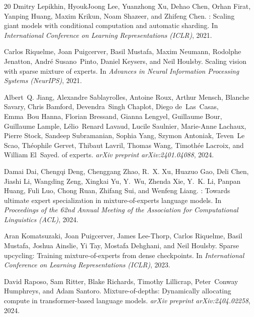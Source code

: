 \documentclass{article}
\begin{document}
\begin{thebibliography}{20}
Dmitry Lepikhin, HyoukJoong Lee, Yuanzhong Xu, Dehao Chen, Orhan Firat, Yanping Huang, Maxim Krikun, Noam Shazeer, and Zhifeng Chen.
: Scaling giant models with conditional computation and automatic sharding.
\newblock In \textit{International Conference on Learning Representations (ICLR)}, 2021.

Carlos Riquelme, Joan Puigcerver, Basil Mustafa, Maxim Neumann, Rodolphe Jenatton, Andr\'{e} Susano~Pinto, Daniel Keysers, and Neil Houlsby.
\newblock Scaling vision with sparse mixture of experts.
\newblock In \textit{Advances in Neural Information Processing Systems (NeurIPS)}, 2021.

Albert~Q. Jiang, Alexandre Sablayrolles, Antoine Roux, Arthur Mensch, Blanche Savary, Chris Bamford, Devendra~Singh Chaplot, Diego de~Las~Casas, Emma~Bou Hanna, Florian Bressand, Gianna Lengyel, Guillaume Bour, Guillaume Lample, L\'{e}lio~Renard Lavaud, Lucile Saulnier, Marie-Anne Lachaux, Pierre Stock, Sandeep Subramanian, Sophia Yang, Szymon Antoniak, Teven~Le Scao, Th\'{e}ophile Gervet, Thibaut Lavril, Thomas Wang, Timoth\'{e}e Lacroix, and William El~Sayed.
 of experts.
\newblock \textit{arXiv preprint arXiv:2401.04088}, 2024.

Damai Dai, Chengqi Deng, Chenggang Zhao, R.~X. Xu, Huazuo Gao, Deli Chen, Jiashi Li, Wangding Zeng, Xingkai Yu, Y.~Wu, Zhenda Xie, Y.~K. Li, Panpan Huang, Fuli Luo, Chong Ruan, Zhifang Sui, and Wenfeng Liang.
: Towards ultimate expert specialization in mixture-of-experts language models.
\newblock In \textit{Proceedings of the 62nd Annual Meeting of the Association for Computational Linguistics (ACL)}, 2024.

Aran Komatsuzaki, Joan Puigcerver, James Lee-Thorp, Carlos Riquelme, Basil Mustafa, Joshua Ainslie, Yi Tay, Mostafa Dehghani, and Neil Houlsby.
\newblock Sparse upcycling: Training mixture-of-experts from dense checkpoints.
\newblock In \textit{International Conference on Learning Representations (ICLR)}, 2023.

David Raposo, Sam Ritter, Blake Richards, Timothy Lillicrap, Peter~Conway Humphreys, and Adam Santoro.
\newblock Mixture-of-depths: Dynamically allocating compute in transformer-based language models.
\newblock \textit{arXiv preprint arXiv:2404.02258}, 2024.


\end{thebibliography}
\end{document}
